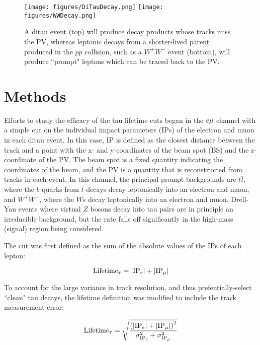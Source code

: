 \begin{figure}[tbh!]
\centering
\texttt{[image: figures/DiTauDecay.png]}
\texttt{[image: figures/WWDecay.png]}
\caption{A ditau event (top) will produce decay products whose tracks miss the PV, whereas leptonic decays from a shorter-lived parent produced in the $pp$ collision, such as a $W^+W^-$ event (bottom), will produce ``prompt" leptons which can be traced back to the PV.}
\label{fig:PromptVsTauDecay}
\end{figure}

\section{Methods}

Efforts to study the efficacy of the tau lifetime cuts began in the $e\mu$ channel with a simple cut on the individual impact parameters (IPs) of the electron and muon in each ditau event. In this case, IP is defined as the closest distance between the track and a point with the x- and y-coordinates of the beam spot (BS) and the z-coordinate of the PV. The beam spot is a fixed quantity indicating the coordinates of the beam, and the PV is a quantity that is reconstructed from tracks in each event. In this channel, the principal prompt backgrounds are $t\bar{t}$, where the $b$ quarks from $t$ decays decay leptonically into an electron and muon, and $W^+W^-$, where the $W$s decay leptonically into an electron and muon. Drell-Yan events where virtual $Z$ bosons decay into tau pairs are in principle an irreducible background, but the rate falls off significantly in the high-mass (signal) region being considered.

The cut was first defined as the sum of the absolute values of the IPs of each lepton:

\begin{equation}
\centering
\textrm{Lifetime}_\tau = |\textrm{IP}_e| + |\textrm{IP}_\mu|
\end{equation}

\noindent To account for the large variance in track resolution, and thus prefentially-select ``clean" tau decays, the lifetime definition was modified to include the track measurement error:

\begin{equation}
\centering
\textrm{Lifetime}_\tau = \sqrt{\frac{\left(|\textrm{IP}_e| + |\textrm{IP}_\mu|\right)^2}{\sigma_{\textrm{IP}_e}^2 + \sigma_{\textrm{IP}_\mu}^2}}
\label{eq:IP}
\end{equation}

